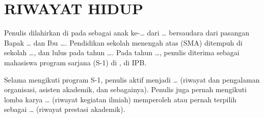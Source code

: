 %

\chapter*{RIWAYAT HIDUP}

Penulis dilahirkan di \TempatLahir{} pada \TanggalLahir{} sebagai anak
ke-\ldots{} dari \ldots{} bersaudara dari pasangan Bapak \ldots{} dan Ibu
\ldots. Pendidikan sekolah menengah atas (SMA) ditempuh di sekolah \ldots,
dan lulus pada tahun \ldots. Pada tahun \ldots, penulis diterima sebagai
mahasiswa program sarjana (S-1) di \ProgramStudi, \Fakultas{} di IPB.

Selama mengikuti program S-1, penulis aktif menjadi \ldots{} (riwayat
dan pengalaman organisasi, asisten akademik, dan sebagainya). Penulis
juga pernah mengikuti lomba karya \ldots{} (riwayat kegiatan ilmiah)
memperoleh atau pernah terpilih sebagai \ldots{} (riwayat prestasi
akademik).
